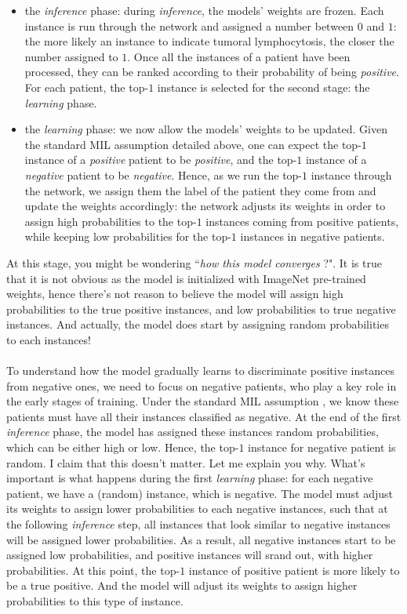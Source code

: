 \documentclass[final]{cvpr}
\begin{document}
	\begin{itemize}
		\setlength\itemsep{-.0em}
		\item the \emph{inference} phase: during \emph{inference}, the models' weights are frozen. Each instance is run through the network and assigned a number between $0$ and $1$: the more likely an instance to indicate tumoral lymphocytosis, the closer the number assigned to $1$. Once all the instances of a patient have been processed, they can be ranked according to their probability of being \emph{positive}. For each patient, the top-$1$ instance is selected for the second stage: the \emph{learning} phase.
		\item the \emph{learning} phase: we now allow the models' weights to be updated. Given the standard MIL assumption detailed above, one can expect the top-$1$ instance of a \emph{positive} patient to be \emph{positive}, and the top-$1$ instance of a \emph{negative} patient to be \emph{negative}. Hence, as we run the top-$1$ instance through the network, we assign them the label of the patient they come from and update the weights accordingly: the network adjusts its weights in order to assign high probabilities to the top-$1$ instances coming from positive patients, while keeping low probabilities for the top-$1$ instances in negative patients. 
	\end{itemize}
	\noindent
	 At this stage, you might be wondering ``\textit{how this model converges} ?". It is true that it is not obvious as the model is initialized with ImageNet pre-trained weights, hence there's not reason to believe the model will assign high probabilities to the true positive instances, and low probabilities to true negative instances. And actually, the model does start by assigning random probabilities to each instances!  \\
	 \\
	 To understand how the model gradually learns to discriminate positive instances from negative ones, we need to focus on negative patients, who play a key role in the early stages of training. Under the standard MIL assumption , we know these patients must have all their instances classified as negative. At the end of the first \textit{inference} phase, the model has assigned these instances random probabilities, which can be either high or low. Hence, the top-$1$ instance for negative patient is random. I claim that this doesn't matter. Let me explain you why. What's important is what happens during the first \textit{learning} phase: for each negative patient, we have a (random) instance, which is negative. The model must adjust its weights to assign lower probabilities to each negative instances, such that at the following \textit{inference} step, all instances that look similar to negative instances will be assigned lower probabilities. As a result, all negative instances start to be assigned low probabilities, and positive instances will srand out, with higher probabilities. At this point, the top-$1$ instance of positive patient is more likely to be a true positive. And the model will adjust its weights to assign higher probabilities to this type of instance.\\
\end{document}
